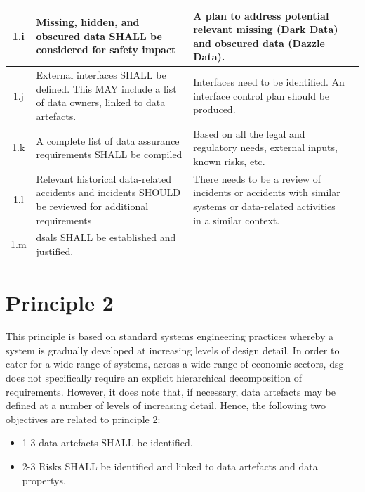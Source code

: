 \begin{longtable}{|C{}|L{}|L{}|L{}|}
	  \\\hline
	1.i & %
	  Missing, hidden, and obscured data SHALL be considered for safety impact &%
	  A plan to address potential relevant missing (Dark Data) and obscured data (Dazzle Data).&%
	  \\\hline
	1.j & %
	  External interfaces SHALL be defined. This MAY include a list of data owners, linked to data artefacts.&%
	  Interfaces need to be identified. An interface control plan should be produced. &%
	  \\\hline
	1.k & %
	  A complete list of data assurance requirements SHALL be compiled & %
	  Based on all the legal and regulatory needs, external inputs, known risks, etc. &%
	  \\\hline
	1.l & %
	  Relevant historical data-related accidents and incidents SHOULD be reviewed for additional requirements &%
	  There needs to be a review of incidents or accidents with similar systems or data-related activities in a similar context. &%
	  \\\hline
	1.m & %
	  \glspl{dsal} SHALL be established and justified.&%
	  &%
	  \\\hline
\end{longtable}
\cbend

\section{Principle 2}

This principle is based on standard systems engineering practices whereby a system is gradually developed at increasing levels of design detail. In order to cater for a wide range of systems, across a wide range of economic sectors, \gls{dsg} does not specifically require an explicit hierarchical decomposition of requirements. However, it does note that, if necessary, \glspl{data artefact} may be defined at a number of levels of increasing detail. Hence, the following two objectives are related to principle 2:

\begin{itemize}
	\item \textcolor{dsiwgAccentColour}{1-3} \Glspl{data artefact} SHALL be identified.
	\item \textcolor{dsiwgAccentColour}{2-3} Risks SHALL be identified and linked to \glspl{data artefact} and \glspl{data property}.
\end{itemize}

